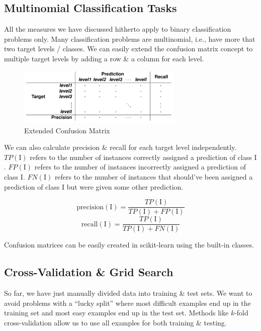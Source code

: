 \documentclass[a4paper,11pt]{article}
\begin{document}
\subsection{Multinomial Classification Tasks}
All the measures we have discussed hitherto apply to binary classification problems only.
Many classification problems are multinomial, i.e., have more that two target levels / classes.
We can easily extend the confusion matrix concept to multiple target levels by adding a row \& a column for each level.
\begin{figure}[H]
    \centering
    \includegraphics[width=0.7\textwidth]{images/expandedconfmatrix.png}
    \caption{Extended Confusion Matrix}
\end{figure}

We can also calculate precision \& recall for each target level independently.
$\textit{TP}(\mathrm{I})$ refers to the number of instances correctly assigned a prediction of class $\mathrm{I}$.
$\textit{FP}(\mathrm{I})$ refers to the number of instances incorrectly assigned a prediction of class $\mathrm{I}$.
$\textit{FN}(\mathrm{I})$ refers to the number of instances that should've been assigned a prediction of class $\mathrm{I}$ but were given some other prediction.

\[
    \text{precision}(\mathrm{I}) = \frac{\textit{TP}(\mathrm{I})}{\textit{TP}(\mathrm{I}) + \textit{FP}(\mathrm{I})}
\]
\[
    \text{recall}(\mathrm{I}) = \frac{\textit{TP}(\mathrm{I})}{\textit{TP}(\mathrm{I}) + \textit{FN}(\mathrm{I})}
\]

Confusion matrices can be easily created in scikit-learn using the built-in classes.

\subsection{Cross-Validation \& Grid Search}
So far, we have just manually divided data into training \& test sets.
We want to avoid problems with a ``lucky split'' where most difficult examples end up in the training set and most easy examples end up in the test set.
Methods like $k$-fold cross-validation allow us to use all examples for both training \& testing.
\end{document}
